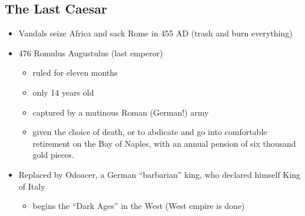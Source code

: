 \documentclass[12pt, twoside]{article}
\begin{document}
\subsection{The Last Caesar}
\begin{itemize}
\item Vandals seize Africa and sack Rome in 455 AD (trash and burn everything)
\item 476 Romulus Augustulus (last emperor)
	\begin{itemize}
	\item ruled for eleven months
	\item only 14 years old
	\item captured by a mutinous Roman (German!) army
	\item given the choice of death, or to abdicate and go into comfortable retirement on the Bay of Naples, with an annual pension of six thousand gold pieces.
	\end{itemize}
\item Replaced by Odoacer, a German “barbarian” king, who declared himself King of Italy
	\begin{itemize}
	\item begins the “Dark Ages” in the West (West empire is done)
	\end{itemize}
\end{itemize}
\end{document}
